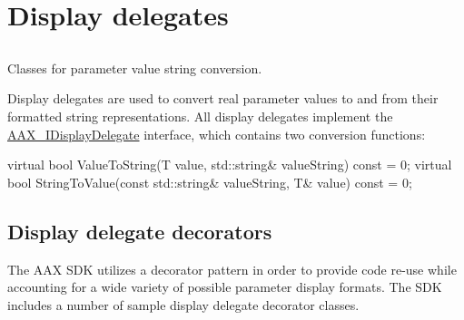\hypertarget{a00346}{}\section{Display delegates}
\label{a00346}


\subsection{ }
Classes for parameter value string conversion. 

Display delegates are used to convert real parameter values to and from their formatted string representations. All display delegates implement the \hyperlink{a00092}{A\+A\+X\+\_\+\+I\+Display\+Delegate} interface, which contains two conversion functions\+:


\begin{DoxyCode}
\textcolor{keyword}{virtual} \textcolor{keywordtype}{bool}    ValueToString(T value, std::string& valueString) \textcolor{keyword}{const} = 0;
\textcolor{keyword}{virtual} \textcolor{keywordtype}{bool}    StringToValue(\textcolor{keyword}{const} std::string& valueString, T& value) \textcolor{keyword}{const} = 0;      
\end{DoxyCode}
\hypertarget{a00346_displaydelegates_decorators}{}\subsection{Display delegate decorators}\label{a00346_displaydelegates_decorators}
The A\+A\+X S\+D\+K utilizes a decorator pattern in order to provide code re-\/use while accounting for a wide variety of possible parameter display formats. The S\+D\+K includes a number of sample display delegate decorator classes.

